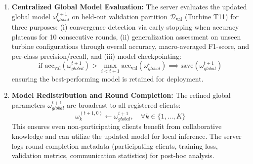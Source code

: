 \documentclass[12pt]{article}
\begin{document}
\begin{enumerate}
    \paragraph{Evaluation Protocol}
    To identify the most effective strategy for our non-IID wind turbine scenario, we conduct preliminary experiments using a representative data subset (30\% of training data) over 5 federated rounds. Each strategy is evaluated on: (i) convergence stability measured by validation loss reduction rate, (ii) classification accuracy and macro F1-score on held-out Turbine T11, and (iii) per-class recall for minority failure modes. The comparative analysis is presented in Section~\ref{sec:results}, and the optimal strategy is selected for full-scale federated training (50 rounds).
    
    Regardless of the chosen aggregation method, the server performs only linear weighted operations on model parameters—never accessing raw SCADA data, intermediate activations, or sample-level gradients—preserving the fundamental privacy guarantees of federated learning.
    
    \item \textbf{Centralized Global Model Evaluation:} 
    The server evaluates the updated global model $\omega_{global}^{t+1}$ on held-out validation partition $\mathcal{D}_{\text{val}}$ (Turbine T11) for three purposes: (i) convergence detection via early stopping when accuracy plateaus for 10 consecutive rounds, (ii) generalization assessment on unseen turbine configurations through overall accuracy, macro-averaged F1-score, and per-class precision/recall, and (iii) model checkpointing:
    \begin{equation}
    \text{if } \text{acc}_{\text{val}}(\omega_{global}^{t+1}) > \max_{i < t+1} \text{acc}_{\text{val}}(\omega_{global}^{i}) \implies \text{save}(\omega_{global}^{t+1})
    \label{eq:checkpointing}
    \end{equation}
    ensuring the best-performing model is retained for deployment.
    
    \item \textbf{Model Redistribution and Round Completion:} 
    The refined global parameters $\omega_{global}^{t+1}$ are broadcast to all registered clients:
    \begin{equation}
    \omega_k^{(t+1,0)} \leftarrow \omega_{global}^{t+1}, \quad \forall k \in \{1, \ldots, K\}
    \label{eq:model_redistribution}
    \end{equation}
    This ensures even non-participating clients benefit from collaborative knowledge and can utilize the updated model for local inference. The server logs round completion metadata (participating clients, training loss, validation metrics, communication statistics) for post-hoc analysis.
\end{enumerate}
\end{document}
